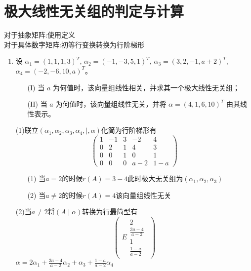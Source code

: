 \documentclass[12pt, a4paper, oneside, UTF8]{ctexbook}
\begin{document}
\section{极大线性无关组的判定与计算}
\begin{remark}[抽象与数字矩阵]
    对于抽象矩阵:使用定义 \\
    对于具体数字矩阵:初等行变换转换为行阶梯形 
\end{remark}
\begin{enumerate}
    \item 设 $\alpha_1 = (1,1,1,3)^T$, $\alpha_2 = (-1,-3,5,1)^T$, $\alpha_3 = (3,2,-1, a+2)^T$, $\alpha_4 = (-2,-6,10, a)^T$。
    \begin{enumerate}
        \item [(I)] 当 $a$ 为何值时，该向量组线性相关，并求其一个极大线性无关组；
        \item [(II)] 当 $a$ 为何值时，该向量组线性无关，并将 $\alpha = (4,1,6,10)^T$ 由其线性表示。
    \end{enumerate}
    
    \begin{solution}
    (1)联立$(\alpha_1,\alpha_2,\alpha_3,\alpha_4,\mid,\alpha)$化简为行阶梯形有
    $$
    \begin{pmatrix}
        1 & -1 & 3 & -2 & 4 \\
        0 & 2 & 1 & 4 & 3 \\
        0 & 0 & 1 & 0 & 1 \\ 
        0 & 0 & 0 & a-2 & 1-a 
    \end{pmatrix}
    $$
    \begin{enumerate}
        \item [(1)] 当$a=2$的时候$r(A)=3-4$此时极大无关组为$(\alpha_1,\alpha_2,\alpha_3)$ 
        \item [(2)] 当$a\neq 2$的时候$r(A)=4$该向量组线性无关 
    \end{enumerate}
    (2)当$a\neq 2$将$(A\mid\alpha)$转换为行最简型有
    $$
    \begin{pmatrix}
        E   \begin{array}{|c}
            2 \\
            \frac{3a-4}{a-2} \\
            1 \\
            \frac{1-a}{a-2}
        \end{array}
    \end{pmatrix}
    $$
    $\alpha=2\alpha_1+\frac{3a-4}{a-2}\alpha_2+\alpha_3+\frac{1-a}{a-2}\alpha_4$
    \end{solution}
    

\end{enumerate}
\end{document}
